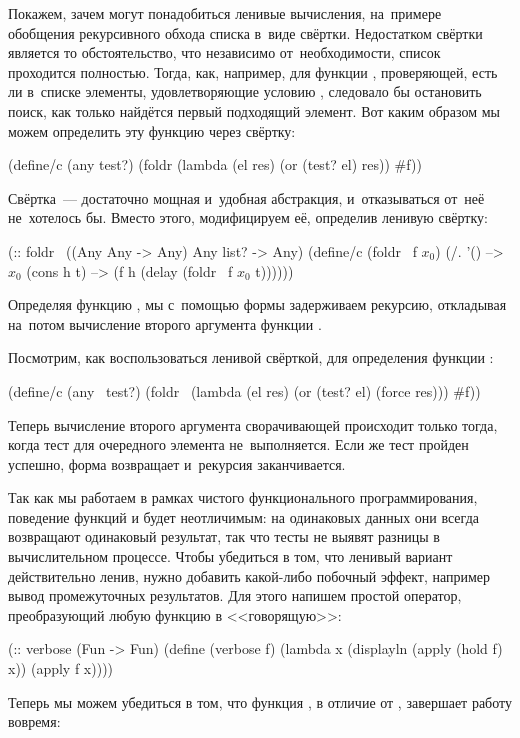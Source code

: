 Покажем, зачем могут понадобиться ленивые вычисления, на~примере обобщения рекурсивного обхода списка в~виде свёртки. Недостатком свёртки является то обстоятельство, что независимо от~необходимости, список проходится полностью. Тогда, как, например, для функции , проверяющей, есть ли в~списке  элементы, удовлетворяющие условию , следовало бы остановить поиск, как только найдётся первый подходящий элемент. Вот каким образом мы можем определить эту функцию через свёртку:

\begin{Definition}[emph={el,res,test?,lst}]
(define/c (any test?)
  (foldr (lambda (el res) (or (test? el) res)) #f))
\end{Definition}

Свёртка~--- достаточно мощная и~удобная абстракция, и~отказываться от~неё не~хотелось бы. Вместо этого, модифицируем её, определив ленивую свёртку:

\begin{Definition}[emph={f,lst,h,t}]
(:: foldr~ ((Any Any -> Any) Any list? -> Any)
 (define/c (foldr~ f $x_0$)
   (/. '() --> $x_0$
       (cons h t) --> (f h (delay (foldr~ f $x_0$ t))))))
\end{Definition}
Определяя функцию , мы с~помощью формы  задерживаем рекурсию, откладывая на~потом вычисление второго аргумента функции .

Посмотрим, как воспользоваться ленивой свёрткой, для определения функции :

\begin{Definition}[emph={test?,lst,el,res}]
(define/c (any~ test?)
  (foldr~ (lambda (el res) (or (test? el) (force res))) #f))
\end{Definition}
Теперь вычисление второго аргумента сворачивающей  происходит только тогда, когда тест для очередного элемента не~выполняется. Если же тест пройден успешно, форма  возвращает  и~рекурсия заканчивается.
\newpage

Так как мы работаем в рамках чистого функционального программирования, поведение функций  и  будет неотличимым: на одинаковых данных они всегда возвращают одинаковый результат, так что тесты не выявят разницы в вычислительном процессе. Чтобы убедиться в том, что ленивый вариант действительно ленив, нужно добавить какой-либо побочный эффект, например вывод промежуточных результатов. Для этого напишем простой оператор, преобразующий любую функцию в <<говорящую>>:
\begin{Definition}[emph={f,x}]
(:: verbose (Fun -> Fun)
 (define (verbose f)
   (lambda x 
     (displayln (apply (hold f) x))
     (apply f x))))
\end{Definition}
Теперь мы можем убедиться в том, что функция , в отличие от , завершает работу вовремя:
\vspace{-\smallskipamount}
\vspace{-\smallskipamount}
    
